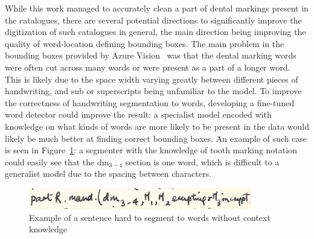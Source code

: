 \documentclass{article}
\begin{document}

While this work managed to accurately clean a part of dental markings present in the catalogues, 
there are several potential directions to significantly improve the digitization of such catalogues in general, the main direction 
being improving the quality of word-location defining bounding boxes. The main problem in the bounding boxes provided 
by Azure Vision~\cite{azurevision} was that the dental marking words were often cut across many words or were present 
as a part of a longer word. This is likely due to the space width varying greatly between different pieces of 
handwriting, and sub or superscripts being unfamiliar to the model. To improve the correctness of handwriting segmentation to words, developing a fine-tuned word detector 
could improve the result: a specialist model encoded with knowledge on what kinds of words are more likely to be 
present in the data would likely be much better at finding correct bounding boxes. An example of 
such case is seen in Figure~\ref{image:hardsentence}: a segmenter with the knowledge of tooth marking notation could 
easily see that the $\text{dm}_{3-4}$ section is one word, which is difficult to a generalist model 
due to the spacing between characters.

\begin{figure}[h]
    \centering
    \includegraphics*[scale=0.8]{../images/hardwordsegmentation.png}
    \caption{Example of a sentence hard to segment to words without context knowledge}
    \label{image:hardsentence}
\end{figure}
\end{document}
